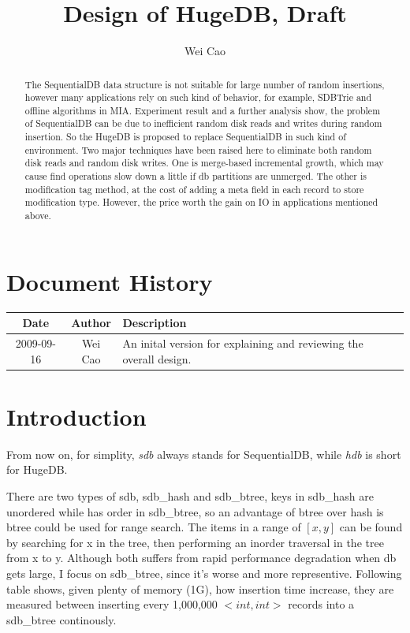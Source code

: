 \documentclass[a4paper,10pt]{article}
\begin{document}

\title{Design of HugeDB, Draft}
\author{Wei Cao}
\maketitle

\begin{abstract}
The SequentialDB data structure is not suitable for large number of random insertions, however many applications rely on such kind of behavior, for example, SDBTrie and offline algorithms in MIA.
Experiment result and a further analysis show, the problem of SequentialDB can be due to inefficient random disk reads and writes during random insertion.
So the HugeDB is proposed to replace SequentialDB in such kind of environment. Two major techniques have been raised here to eliminate both random disk reads and random disk writes.
One is merge-based incremental growth, which may cause find operations slow down a little if db partitions are unmerged.
The other is modification tag method, at the cost of adding a meta field in each record to store modification type.
However, the price worth the gain on IO in applications mentioned above.
\end{abstract}

\tableofcontents

\section{Document History}
\begin{center}
\begin{tabular}{|c|c|p{7cm}|}
    \hline
    Date & Author & Description \\ \hline
    2009-09-16& Wei Cao & An inital version for explaining and reviewing the overall design. \\ \hline
\end{tabular}
\end{center}

\section{Introduction}
From now on, for simplity, \emph{sdb} always stands for SequentialDB, while \emph{hdb} is short for HugeDB.

There are two types of sdb, sdb\_hash and sdb\_btree, keys in sdb\_hash are unordered while has order in sdb\_btree, so an advantage of btree over hash is btree could be used for range search.
The items in a range of $[x,y]$ can be found by searching for x in the tree, then performing an inorder traversal in the tree from x to y.
Although both suffers from rapid performance degradation when db gets large, I focus on sdb\_btree, since it's worse and more representive.
Following table shows, given plenty of memory (1G), how insertion time increase, they are measured between inserting every 1,000,000 $<int, int>$ records into a sdb\_btree continously.
\end{document}
